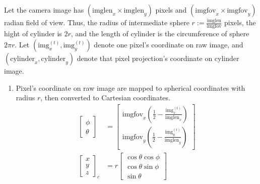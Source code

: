 \documentclass[conference]{IEEEtran}
\begin{document}
Let the camera image has $\left(\text{imglen}_{x} \times \text{imglen}_{y}\right)$ pixels
and $\left(\text{imgfov}_{x} \times \text{imgfov}_{y}\right)$ radian field of view.
Thus, the radius of intermediate sphere 
$r := \frac{\text{imglen}}{\text{imgfov}}$ pixels,
the hight of cylinder is $2r$, 
and the length of cylinder is the circumference of sphere $2\pi r$.
Let $\left(\text{img}^{(t)}_{x}, \text{img}^{(t)}_{y}\right)$ 
denote one pixel's coordinate on raw image, 
and $\left(\text{cylinder}_{x}, \text{cylinder}_{y}\right)$
denote that pixel projection's coordinate on cylinder image.


\begin{enumerate}
    \item Pixel's coordinate on raw image are 
    mapped to spherical coordinates with radius $r$, 
    then converted to Cartesian coordinates.
    $$
    \begin{aligned}
    \left[ \begin{matrix}\phi \\\theta \end{matrix} \right]  
        &=\left[ \begin{matrix}
            \text{imgfov}_{x} (\frac{1}{2} -\frac{\text{img}^{(t)}_{x}}{\text{imglen}_{x}} ) \\
            \text{imgfov}_{y} (\frac{1}{2} -\frac{\text{img}^{(t)}_{y}}{\text{imglen}_{y}} )
        \end{matrix} \right]  \\
    \left[ \begin{matrix}x\\y\\z\end{matrix} \right]_c  
        &=r\left[ \begin{matrix}
            \cos \theta \cos \phi \\
            \cos \theta \sin \phi \\
            \sin \theta 
        \end{matrix} \right]  
    \end{aligned} 
    $$


\end{enumerate}
\end{document}
